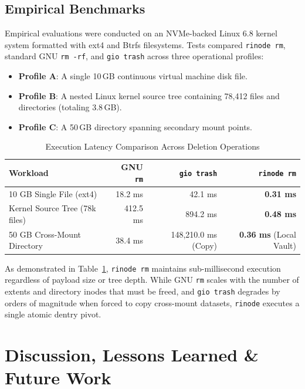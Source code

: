 \documentclass[11pt,a4paper]{article}
\begin{document}
\subsection{Empirical Benchmarks}
Empirical evaluations were conducted on an NVMe-backed Linux 6.8 kernel system formatted with ext4 and Btrfs filesystems. Tests compared \texttt{rinode rm}, standard GNU \texttt{rm -rf}, and \texttt{gio trash} across three operational profiles:
\begin{itemize}[leftmargin=1.5em]
    \item \textbf{Profile A}: A single 10\,GB continuous virtual machine disk file.
    \item \textbf{Profile B}: A nested Linux kernel source tree containing 78,412 files and directories (totaling 3.8\,GB).
    \item \textbf{Profile C}: A 50\,GB directory spanning secondary mount points.
\end{itemize}

\begin{table}[h]
\centering
\small
\caption{Execution Latency Comparison Across Deletion Operations}
\label{tab:benchmarks}
\begin{tabular}{lrrr}
\toprule
\textbf{Workload} & \textbf{GNU \texttt{rm}} & \textbf{\texttt{gio trash}} & \textbf{\texttt{rinode rm}} \\
\midrule
10 GB Single File (ext4) & 18.2 ms & 42.1 ms & \textbf{0.31 ms} \\
Kernel Source Tree (78k files) & 412.5 ms & 894.2 ms & \textbf{0.48 ms} \\
50 GB Cross-Mount Directory & 38.4 ms & 148,210.0 ms (Copy) & \textbf{0.36 ms} (Local Vault) \\
\bottomrule
\end{tabular}
\end{table}

As demonstrated in Table~\ref{tab:benchmarks}, \texttt{rinode rm} maintains sub-millisecond execution regardless of payload size or tree depth. While GNU \texttt{rm} scales with the number of extents and directory inodes that must be freed, and \texttt{gio trash} degrades by orders of magnitude when forced to copy cross-mount datasets, \texttt{rinode} executes a single atomic dentry pivot.

\section{Discussion, Lessons Learned \& Future Work}
\end{document}
